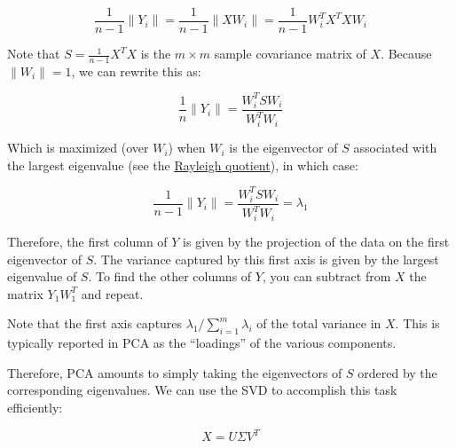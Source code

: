 \documentclass[
  letterpaper,
  DIV=11,
  numbers=noendperiod]{scrreprt}
\newenvironment{Shaded}{\begin{snugshade}}{\end{snugshade}}
\newcommand{\NormalTok}[1]{\textcolor[rgb]{0.00,0.23,0.31}{#1}}
\begin{document}
\[\frac{1}{n-1}\|Y_i\| = \frac{1}{n-1}\|XW_i \| = \frac{1}{n-1} W_i^TX^T X W_i\]

Note that \(S = \frac{1}{n-1} X^T X\) is the \(m \times m\) sample
covariance matrix of \(X\). Because \(\|W_i\| = 1\), we can rewrite this
as:

\[
\frac{1}{n}\|Y_i\| = \frac{W_i^T S W_i}{W_i^T W_i}
\]

Which is maximized (over \(W_i\)) when \(W_i\) is the eigenvector of
\(S\) associated with the largest eigenvalue (see the
\href{https://en.wikipedia.org/wiki/Rayleigh_quotient}{Rayleigh
quotient}), in which case:

\[
\frac{1}{n-1}\|Y_i\| = \frac{W_i^T S W_i}{W_i^T W_i} = \lambda_1
\]

Therefore, the first column of \(Y\) is given by the projection of the
data on the first eigenvector of \(S\). The variance captured by this
first axis is given by the largest eigenvalue of \(S\). To find the
other columns of \(Y\), you can subtract from \(X\) the matrix
\(Y_1 W_1^T\) and repeat.

Note that the first axis captures
\(\lambda_1 / \sum_{i = 1}^m \lambda_i\) of the total variance in \(X\).
This is typically reported in PCA as the ``loadings'' of the various
components.

\begin{Shaded}
\end{Shaded}

\begin{Shaded}
\end{Shaded}

Therefore, PCA amounts to simply taking the eigenvectors of \(S\)
ordered by the corresponding eigenvalues. We can use the SVD to
accomplish this task efficiently:

\[
X = U \Sigma V^T
\]
\end{document}
